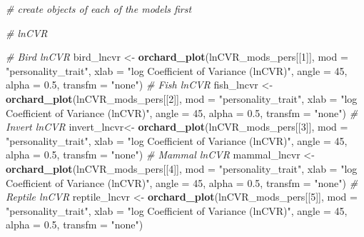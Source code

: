 \documentclass[]{article}
\newenvironment{Shaded}{\begin{snugshade}}{\end{snugshade}}
\newcommand{\KeywordTok}[1]{\textcolor[rgb]{0.13,0.29,0.53}{\textbf{#1}}}
\newcommand{\DataTypeTok}[1]{\textcolor[rgb]{0.13,0.29,0.53}{#1}}
\newcommand{\DecValTok}[1]{\textcolor[rgb]{0.00,0.00,0.81}{#1}}
\newcommand{\FloatTok}[1]{\textcolor[rgb]{0.00,0.00,0.81}{#1}}
\newcommand{\StringTok}[1]{\textcolor[rgb]{0.31,0.60,0.02}{#1}}
\newcommand{\CommentTok}[1]{\textcolor[rgb]{0.56,0.35,0.01}{\textit{#1}}}
\newcommand{\NormalTok}[1]{#1}
\begin{document}
\begin{Shaded}
\begin{Highlighting}[]
\CommentTok{# create objects of each of the models first}

\CommentTok{# lnCVR}

  \CommentTok{# Bird lnCVR}
\NormalTok{  bird_lncvr <-}\StringTok{ }\KeywordTok{orchard_plot}\NormalTok{(lnCVR_mods_pers[[}\DecValTok{1}\NormalTok{]], }\DataTypeTok{mod =} \StringTok{"personality_trait"}\NormalTok{, }\DataTypeTok{xlab =} \StringTok{"log Coefficient of Variance (lnCVR)"}\NormalTok{, }\DataTypeTok{angle =} \DecValTok{45}\NormalTok{, }\DataTypeTok{alpha =} \FloatTok{0.5}\NormalTok{, }\DataTypeTok{transfm =} \StringTok{"none"}\NormalTok{)}
  \CommentTok{# Fish lnCVR}
\NormalTok{  fish_lncvr <-}\StringTok{ }\KeywordTok{orchard_plot}\NormalTok{(lnCVR_mods_pers[[}\DecValTok{2}\NormalTok{]], }\DataTypeTok{mod =} \StringTok{"personality_trait"}\NormalTok{, }\DataTypeTok{xlab =} \StringTok{"log Coefficient of Variance (lnCVR)"}\NormalTok{, }\DataTypeTok{angle =} \DecValTok{45}\NormalTok{, }\DataTypeTok{alpha =} \FloatTok{0.5}\NormalTok{, }\DataTypeTok{transfm =} \StringTok{"none"}\NormalTok{)}
  \CommentTok{# Invert lnCVR}
\NormalTok{  invert_lncvr<-}\StringTok{ }\KeywordTok{orchard_plot}\NormalTok{(lnCVR_mods_pers[[}\DecValTok{3}\NormalTok{]], }\DataTypeTok{mod =} \StringTok{"personality_trait"}\NormalTok{, }\DataTypeTok{xlab =} \StringTok{"log Coefficient of Variance (lnCVR)"}\NormalTok{, }\DataTypeTok{angle =} \DecValTok{45}\NormalTok{, }\DataTypeTok{alpha =} \FloatTok{0.5}\NormalTok{, }\DataTypeTok{transfm =} \StringTok{"none"}\NormalTok{)}
  \CommentTok{# Mammal lnCVR}
\NormalTok{  mammal_lncvr <-}\StringTok{ }\KeywordTok{orchard_plot}\NormalTok{(lnCVR_mods_pers[[}\DecValTok{4}\NormalTok{]], }\DataTypeTok{mod =} \StringTok{"personality_trait"}\NormalTok{, }\DataTypeTok{xlab =} \StringTok{"log Coefficient of Variance (lnCVR)"}\NormalTok{, }\DataTypeTok{angle =} \DecValTok{45}\NormalTok{, }\DataTypeTok{alpha =} \FloatTok{0.5}\NormalTok{, }\DataTypeTok{transfm =} \StringTok{"none"}\NormalTok{)}
  \CommentTok{# Reptile lnCVR}
\NormalTok{  reptile_lncvr <-}\StringTok{ }\KeywordTok{orchard_plot}\NormalTok{(lnCVR_mods_pers[[}\DecValTok{5}\NormalTok{]], }\DataTypeTok{mod =} \StringTok{"personality_trait"}\NormalTok{, }\DataTypeTok{xlab =} \StringTok{"log Coefficient of Variance (lnCVR)"}\NormalTok{, }\DataTypeTok{angle =} \DecValTok{45}\NormalTok{, }\DataTypeTok{alpha =} \FloatTok{0.5}\NormalTok{, }\DataTypeTok{transfm =} \StringTok{"none"}\NormalTok{)}
\end{Highlighting}
\end{Shaded}
\end{document}
